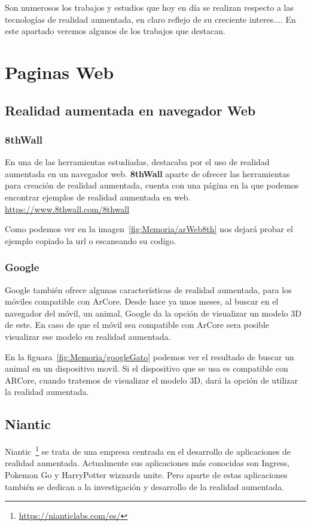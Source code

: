 
Son numerosos los trabajos y estudios que hoy en día se realizan respecto a las tecnologías de realidad aumentada, en claro reflejo de su creciente interes....  En este apartado veremos algunos de los trabajos que destacan.

\section{Paginas Web}
\subsection{Realidad aumentada en navegador Web}
\subsubsection{8thWall}
En una de las herramientas estudiadas, destacaba por el uso de realidad aumentada en un navegador web.
\textbf{8thWall} aparte de ofrecer las herramientas para creación de realidad aumentada, cuenta con una página en la que podemos encontrar ejemplos de realidad aumentada en web.
\url{https://www.8thwall.com/8thwall}


Como podemos ver en la imagen~\ref{fig:Memoria/arWeb8th} nos dejará probar el ejemplo copiado la url o escaneando su codigo.

\subsubsection{Google}
Google también ofrece algunas características de realidad aumentada, para los móviles compatible con ArCore. Desde hace ya unos meses, al buscar en el navegador del móvil, un animal, Google da la opción de visualizar un modelo 3D de este. En caso de que el móvil sea compatible con ArCore sera posible visualizar ese modelo en realidad aumentada.

En la figuara~\ref{fig:Memoria/googleGato} podemos ver el resultado de buscar un animal en un dispositivo movil. Si el dispositivo que se usa es compatible con ARCore, cuando tratemos de visualizar el modelo 3D, dará la opción de utilizar la realidad aumentada.


\subsection{Niantic}
Niantic~\footnote{\url{https://nianticlabs.com/es/}} se trata de una empresa centrada en el desarrollo de aplicaciones de realidad aumentada. Actualmente sus aplicaciones más conocidas son Ingress, Pokemon Go y HarryPotter wizzards unite.
Pero aparte de estas aplicaciones también se dedican a la investigación y desarrollo de la realidad aumentada.

